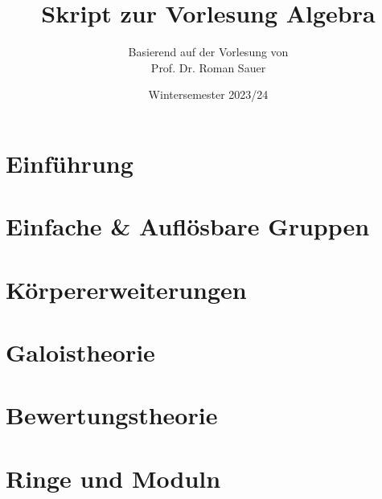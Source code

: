 \documentclass[11pt,a4paper]{article}
\title{Skript zur Vorlesung Algebra}
\author{Basierend auf der Vorlesung von\\Prof. Dr. Roman Sauer}
\date{Wintersemester 2023/24}
\theoremstyle{definition}
\theoremstyle{remark}
\begin{document}
\maketitle
\tableofcontents

\newpage

\section*{Einführung}



\newpage

\section{Einfache \& Auflösbare Gruppen}



\section{Körpererweiterungen}



\section{Galoistheorie}



\section{Bewertungstheorie}


\section{Ringe und Moduln}

\end{document}
